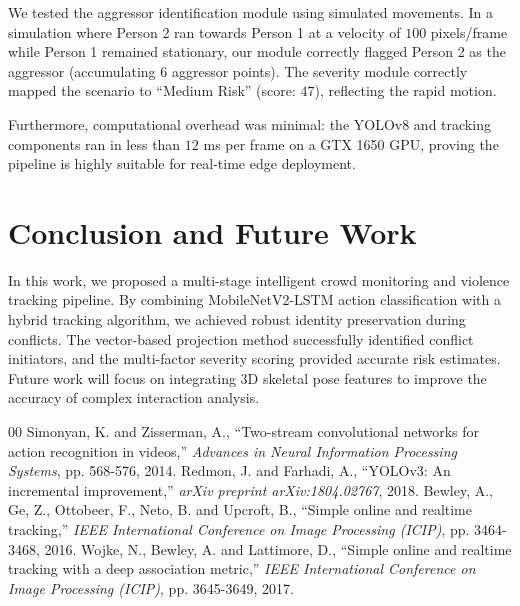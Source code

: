 \documentclass[conference]{IEEEtran}
\begin{document}
We tested the aggressor identification module using simulated movements. In a simulation where Person 2 ran towards Person 1 at a velocity of $100$ pixels/frame while Person 1 remained stationary, our module correctly flagged Person 2 as the aggressor (accumulating $6$ aggressor points). The severity module correctly mapped the scenario to ``Medium Risk'' (score: $47$), reflecting the rapid motion.

Furthermore, computational overhead was minimal: the YOLOv8 and tracking components ran in less than $12$ ms per frame on a GTX 1650 GPU, proving the pipeline is highly suitable for real-time edge deployment.

\section{Conclusion and Future Work}
In this work, we proposed a multi-stage intelligent crowd monitoring and violence tracking pipeline. By combining MobileNetV2-LSTM action classification with a hybrid tracking algorithm, we achieved robust identity preservation during conflicts. The vector-based projection method successfully identified conflict initiators, and the multi-factor severity scoring provided accurate risk estimates. Future work will focus on integrating 3D skeletal pose features to improve the accuracy of complex interaction analysis.

\begin{thebibliography}{00}
 Simonyan, K. and Zisserman, A., ``Two-stream convolutional networks for action recognition in videos,'' \textit{Advances in Neural Information Processing Systems}, pp. 568-576, 2014.
 Redmon, J. and Farhadi, A., ``YOLOv3: An incremental improvement,'' \textit{arXiv preprint arXiv:1804.02767}, 2018.
 Bewley, A., Ge, Z., Ottobeer, F., Neto, B. and Upcroft, B., ``Simple online and realtime tracking,'' \textit{IEEE International Conference on Image Processing (ICIP)}, pp. 3464-3468, 2016.
 Wojke, N., Bewley, A. and Lattimore, D., ``Simple online and realtime tracking with a deep association metric,'' \textit{IEEE International Conference on Image Processing (ICIP)}, pp. 3645-3649, 2017.
\end{thebibliography}
\end{document}
